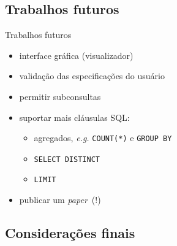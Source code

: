 \documentclass[12pt]{beamer}
\begin{document}
\subsection{Trabalhos futuros}
\begin{frame}{Trabalhos futuros}
\begin{itemize}[<+->]
  \item interface gráfica (visualizador)
  \vfill
  \item validação das especificações do usuário
  \vfill
  \item permitir subconsultas
  \vfill
  \item suportar mais cláusulas SQL:
    \begin{itemize}[<.->]
      \item agregados, \textit{e.g.} \texttt{COUNT(*)} e \texttt{GROUP BY}
      \item \texttt{SELECT DISTINCT}
      \item \texttt{LIMIT}
    \end{itemize}
  \vfill
  \item publicar um \emph{paper}~(!)
\end{itemize}

\end{frame}


\subsection*{Considerações finais}
\end{document}
